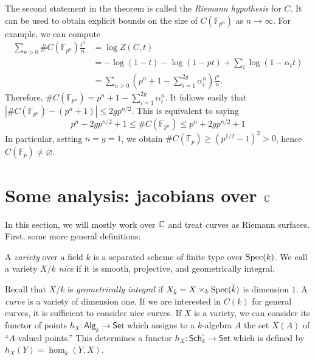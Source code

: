 \documentclass{article}
\begin{document}
The second statement in the theorem is called the \emph{Riemann hypothesis} 
for $C$. It can be used to obtain explicit bounds on the size of 
$C(\mathbb{F}_{p^n})$ as $n\to\infty$. For example, we can compute 
\begin{align*}
  \sum_{n>0} \# C(\mathbb{F}_{p^n}) \frac{t^n}{n} 
    &= \log Z(C,t) \\
    &= -\log(1-t) - \log(1-p t) + \sum_i \log(1-\alpha_t t) \\
    &= \sum_{n>0} \left(p^n+1-\sum_{i=1}^{2 g} \alpha_i^n\right) \frac{t^n}{n} \text{.}
\end{align*}
Therefore, $\# C(\mathbb{F}_{p^n}) = p^n+1-\sum_{i=1}^{2 g} \alpha_i^n$. It 
follows easily that $|\# C(\mathbb{F}_{p^n})-(p^n+1)| \leqslant 2 g p^{n/2}$. 
This is equivalent to saying 
\[
  p^n-2 g p^{n/2}+1 \leqslant \# C(\mathbb{F}_{p^n}) \leqslant p^n + 2 g p^{n/2} + 1
\]
In particular, setting $n = g = 1$, we obtain 
$\# C(\mathbb{F}_p) \geqslant (p^{1/2}-1)^2>0$, hence 
$C(\mathbb{F}_p)\ne\varnothing$. 











\section{Some analysis: jacobians over \texorpdfstring{$\mathbb{C}$}{C}}

In this section, we will mostly work over $\mathbb{C}$ and treat curves as 
Riemann surfaces. First, some more general definitions:

\begin{definition}
A \emph{variety} over a field $k$ is a separated scheme of finite type over 
$\operatorname{Spec}(k)$. We call a variety $X/k$ \emph{nice} if it is smooth, projective, 
and geometrically integral.
\end{definition}

Recall that $X/k$ is \emph{geometrically integral} if 
$X_{\bar k}=X\times_k \operatorname{Spec}(\bar k)$ is dimension $1$. A \emph{curve} is a 
variety of dimension one. If we are interested in $C(k)$ for general curves, 
it is sufficient to consider nice curves. If $X$ is a variety, we can consider 
its functor of points $h_X:\mathsf{Alg}_k\to \mathsf{Set}$ which assigns to a 
$k$-algebra $A$ the set $X(A)$ of ``$A$-valued points.'' This determines a 
functor $h_X:\mathsf{Sch}_k^\circ\to\mathsf{Set}$ which is defined by 
$h_X(Y)=\hom_k(Y,X)$. 
\end{document}

